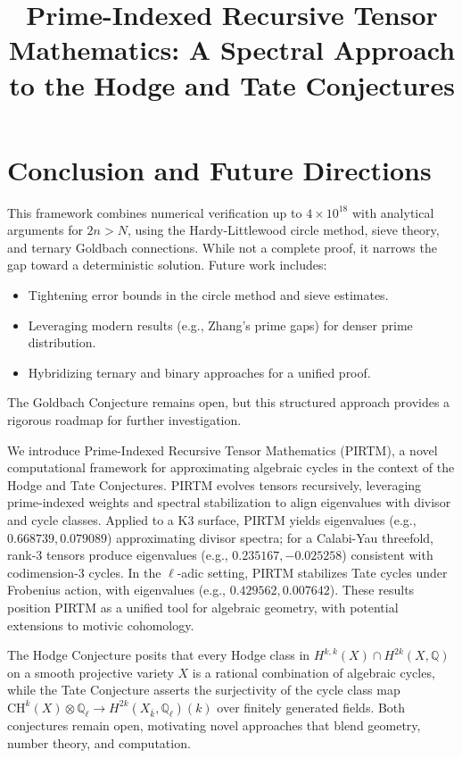\documentclass[11pt]{article}
\theoremstyle{plain}
\begin{document}
\section{Conclusion and Future Directions}
This framework combines numerical verification up to $4 \times 10^{18}$ with analytical arguments for $2n > N$, using the Hardy-Littlewood circle method, sieve theory, and ternary Goldbach connections. While not a complete proof, it narrows the gap toward a deterministic solution. Future work includes:
\begin{itemize}
    \item Tightening error bounds in the circle method and sieve estimates.
    \item Leveraging modern results (e.g., Zhang’s prime gaps) for denser prime distribution.
    \item Hybridizing ternary and binary approaches for a unified proof.
\end{itemize}

The Goldbach Conjecture remains open, but this structured approach provides a rigorous roadmap for further investigation.


\title{Prime-Indexed Recursive Tensor Mathematics: A Spectral Approach to the Hodge and Tate Conjectures}

We introduce Prime-Indexed Recursive Tensor Mathematics (PIRTM), a novel computational framework for approximating algebraic cycles in the context of the Hodge and Tate Conjectures. PIRTM evolves tensors recursively, leveraging prime-indexed weights and spectral stabilization to align eigenvalues with divisor and cycle classes. Applied to a K3 surface, PIRTM yields eigenvalues (e.g., $0.668739, 0.079089$) approximating divisor spectra; for a Calabi-Yau threefold, rank-3 tensors produce eigenvalues (e.g., $0.235167, -0.025258$) consistent with codimension-3 cycles. In the \(\ell\)-adic setting, PIRTM stabilizes Tate cycles under Frobenius action, with eigenvalues (e.g., $0.429562, 0.007642$). These results position PIRTM as a unified tool for algebraic geometry, with potential extensions to motivic cohomology.

The Hodge Conjecture posits that every Hodge class in \(H^{k,k}(X) \cap H^{2k}(X, \mathbb{Q})\) on a smooth projective variety \(X\) is a rational combination of algebraic cycles, while the Tate Conjecture asserts the surjectivity of the cycle class map \(\text{CH}^k(X) \otimes \mathbb{Q}_\ell \to H^{2k}(X_{\overline{k}}, \mathbb{Q}_\ell)(k)\) over finitely generated fields. Both conjectures remain open, motivating novel approaches that blend geometry, number theory, and computation.
\end{document}
